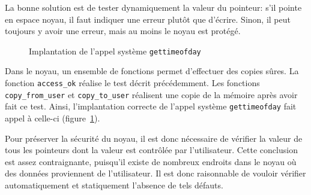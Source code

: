 La bonne solution est de tester dynamiquement la valeur du pointeur: s'il pointe
en espace noyau, il faut indiquer une erreur plutôt que d'écrire. Sinon, il peut
toujours y avoir une erreur, mais au moins le noyau est protégé.

\begin{figure}
\caption{Implantation de l'appel système \texttt{gettimeofday}}
\label{fig:implem-gettime}
\end{figure}

Dans le noyau, un ensemble de fonctions permet d'effectuer des copies sûres. La
fonction \texttt{access\_ok} réalise le test décrit précédemment. Les fonctions
\texttt{copy\_from\_user} et \nolinkurl{copy_to_user} réalisent une copie de la
mémoire après avoir fait ce test. Ainsi, l'implantation correcte de l'appel
système \texttt{gettimeofday} fait appel à celle-ci
(figure~\ref{fig:implem-gettime}).

Pour préserver la sécurité du noyau, il est donc nécessaire de vérifier la
valeur de tous les pointeurs dont la valeur est contrôlée par l'utilisateur.
Cette conclusion est assez contraignante, puisqu'il existe de nombreux endroits
dans le noyau où des données proviennent de l'utilisateur. Il est donc
raisonnable de vouloir vérifier automatiquement et statiquement l'absence de
tels défauts.







